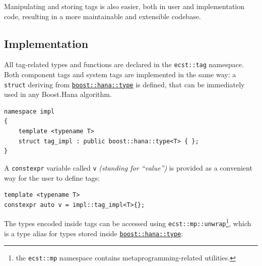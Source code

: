 \documentclass[twoside, 12pt, a4paper, openright]{book}
\begin{document}
Manipulating and storing tags is also easier, both in user and
implementation code, resulting in a more maintainable and extensible
codebase.

\subsection{Implementation}\label{implementation-3}

All tag-related types and functions are declared in the
\texttt{ecst::tag}
namespace. Both component tags and system tags are implemented in the
same way: a
\texttt{struct}
deriving from
\href{http://www.boost.org/doc/libs/1_61_0/libs/hana/doc/html/structboost_1_1hana_1_1type.html}{\texttt{boost::hana::type}}
is defined, that can be immediately used in any Boost.Hana algorithm.

\begin{verbatim}
namespace impl
{
    template <typename T>
    struct tag_impl : public boost::hana::type<T> { };
}
\end{verbatim}

A
\texttt{constexpr}
variable called
\texttt{v}
\emph{(standing for ``value'')} is provided as a convenient way for the
user to define tags:

\begin{verbatim}
template <typename T>
constexpr auto v = impl::tag_impl<T>{};
\end{verbatim}

The types encoded inside tags can be accessed using
\texttt{ecst::mp::unwrap}\footnote{the
  \texttt{ecst::mp}
  namespace contains metaprogramming-related utilities.}, which is a
type alias for types stored inside
\href{http://www.boost.org/doc/libs/1_61_0/libs/hana/doc/html/structboost_1_1hana_1_1type.html}{\texttt{boost::hana::type}}:
\end{document}
